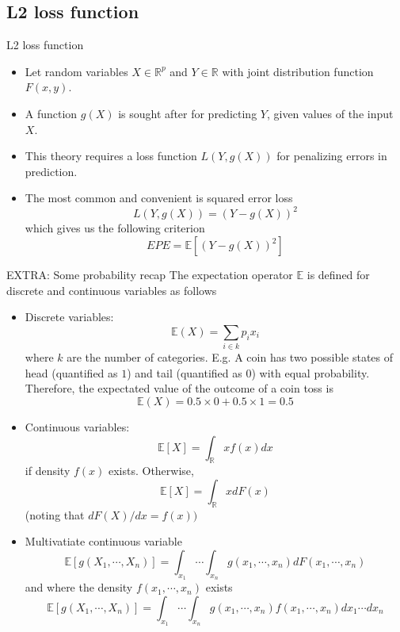 \documentclass{beamer}
\newcommand{\E}{\mathbb{E}}
\newcommand{\R}{\mathbb{R}}
\begin{document}
\subsection{L2 loss function}
\begin{frame}{L2 loss function}
\begin{itemize}
\item{} Let random variables $X\in \mathbb{R}^p$ and $Y\in\mathbb{R}$ with joint distribution function $F(x,y)$.
\item{} A function $g(X)$ is sought after for predicting $Y$, given values of the input $X$.
\item{} This theory requires a loss function $L(Y,g(X))$ for penalizing errors in prediction.
\item{} The most common and convenient is squared error loss 
\begin{equation}
L(Y,g(X))=(Y-g(X))^2
\end{equation}
which gives us the following criterion
\begin{equation}\label{eq: EPE}
EPE=\mathbb{E}[(Y-g(X))^2]
\end{equation}
\end{itemize}
\end{frame}

\begin{frame}{EXTRA: Some probability recap}
The expectation operator $\mathbb{E}$ is defined for discrete and continuous variables as follows
\begin{itemize}
\item{} Discrete variables:
\[
\mathbb{E}(X)=\sum\limits_{i\in k}p_ix_i
\]
where $k$ are the number of categories.
E.g. A coin has two possible states of head (quantified as $1$) and tail (quantified as $0$) with equal probability. Therefore, the expectated value of the outcome of a coin toss is
\[
\E(X)=0.5\times 0 +0.5\times 1=0.5
\]
\end{itemize}
\end{frame}

\begin{frame}
\begin{itemize}
\item{} Continuous variables:
\[
\E[X]=\int_{\R}xf(x)dx
\]
if density $f(x)$ exists. Otherwise,
\[
\E[X]=\int_{\R}xdF(x)
\]
(noting that $dF(X)/dx=f(x))$
\item{} Multivatiate continuous variable
\[
\E[g(X_1,\cdots,X_n)]=\int_{x_1}\cdots\int_{x_n} g(x_1,\cdots,x_n)dF(x_1,\cdots,x_n)
\]
and where the density $f(x_1,\cdots,x_n)$ exists
\[
\E[g(X_1,\cdots,X_n)]=\int_{x_1}\cdots\int_{x_n} g(x_1,\cdots,x_n)f(x_1,\cdots,x_n)dx_1\cdots dx_n
\]
\end{itemize}
\end{frame}
\end{document}

